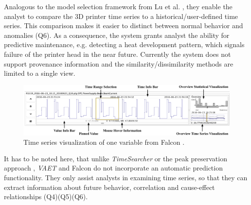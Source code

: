 \documentclass[electronic]{vgtc}             %
\begin{document}
Analogous to the model selection framework from Lu et al. \cite{lu:2014}, they enable the analyst to compare the 3D printer time series to a historical/user-defined time series. 
This comparison makes it easier to distinct between normal behavior and anomalies (Q6). 
As a consequence, the system grants analyst the ability for predictive maintenance, e.g. detecting a heat development pattern, which signals failure of the printer head in the near future. 
Currently the system does not support provenance information and the similarity/dissimilarity methods are limited to a single view.

\begin{figure}[b]
	\centering
	\includegraphics[width=\columnwidth]{Falcon}
	\caption{Time series visualization of one variable from Falcon \cite{steed:2017}.
	}
	\label{fig:falcon}
\end{figure}

It has to be noted here, that unlike \textit{TimeSearcher} \cite{buono:2007} or the peak preservation approach \cite{Hao:2012}, \textit{VAET}  \cite{Xie:2014} and Falcon \cite{steed:2017} do not incorporate an automatic prediction functionality.
They only assist analysts in examining time series, so that they can extract information about future behavior, correlation and cause-effect relationships  (Q4)(Q5)(Q6). 
\end{document}
